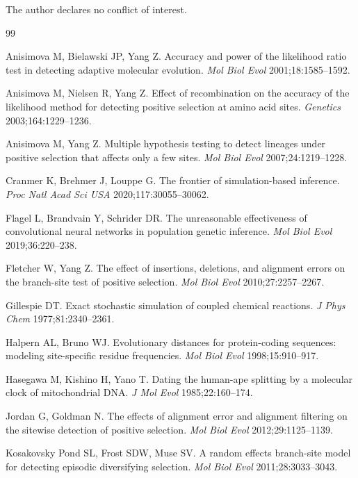 \documentclass[11pt]{article}
\begin{document}
The author declares no conflict of interest.

\begin{thebibliography}{99}

Anisimova M, Bielawski JP, Yang Z.
Accuracy and power of the likelihood ratio test in detecting adaptive molecular evolution.
\emph{Mol Biol Evol} 2001;18:1585--1592.

Anisimova M, Nielsen R, Yang Z.
Effect of recombination on the accuracy of the likelihood method for detecting positive selection at amino acid sites.
\emph{Genetics} 2003;164:1229--1236.

Anisimova M, Yang Z.
Multiple hypothesis testing to detect lineages under positive selection that affects only a few sites.
\emph{Mol Biol Evol} 2007;24:1219--1228.

Cranmer K, Brehmer J, Louppe G.
The frontier of simulation-based inference.
\emph{Proc Natl Acad Sci USA} 2020;117:30055--30062.

Flagel L, Brandvain Y, Schrider DR.
The unreasonable effectiveness of convolutional neural networks in population genetic inference.
\emph{Mol Biol Evol} 2019;36:220--238.

Fletcher W, Yang Z.
The effect of insertions, deletions, and alignment errors on the branch-site test of positive selection.
\emph{Mol Biol Evol} 2010;27:2257--2267.

Gillespie DT.
Exact stochastic simulation of coupled chemical reactions.
\emph{J Phys Chem} 1977;81:2340--2361.

Halpern AL, Bruno WJ.
Evolutionary distances for protein-coding sequences: modeling site-specific residue frequencies.
\emph{Mol Biol Evol} 1998;15:910--917.

Hasegawa M, Kishino H, Yano T.
Dating the human-ape splitting by a molecular clock of mitochondrial DNA.
\emph{J Mol Evol} 1985;22:160--174.

Jordan G, Goldman N.
The effects of alignment error and alignment filtering on the sitewise detection of positive selection.
\emph{Mol Biol Evol} 2012;29:1125--1139.

Kosakovsky Pond SL, Frost SDW, Muse SV.
A random effects branch-site model for detecting episodic diversifying selection.
\emph{Mol Biol Evol} 2011;28:3033--3043.


\end{thebibliography}
\end{document}

